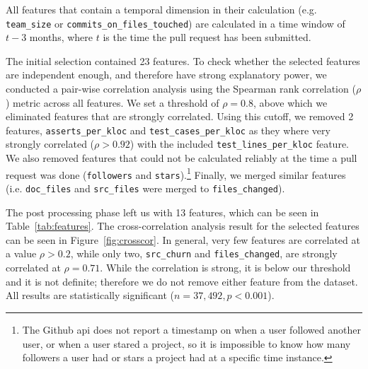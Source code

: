 \documentclass{acm_proc_article-sp}
\begin{document}
All features that contain a temporal dimension in their
calculation (e.g. \texttt{team\_size} or \texttt{commits\_on\_files\_touched})
are calculated in a time window of $t - 3$ months, where $t$ is the time the
pull request has been submitted. 

The initial selection contained 23 features. To check whe\-ther the selected
features are independent enough, and therefore have strong explanatory power, we
conducted a pair-wise correlation analysis using the Spearman rank correlation
($\rho$) metric across all features. We set a threshold of $\rho = 0.8$, above
which we eliminated features that are strongly correlated. Using this cutoff, we
removed 2 features, \texttt{asserts\_per\_kloc} and
\texttt{test\_cases\_per\_kloc} as they where very strongly correlated ($\rho >
0.92$) with the included \texttt{test\_lines\_per\_kloc} feature. We also
removed features that could not be calculated reliably at the time a pull
request was done (\texttt{followers} and \texttt{stars}).\footnote{The Github
{\sc api} does not report a timestamp on when a user followed another user, or
when a user stared a project, so it is impossible to know how many followers a
user had or stars a project had at a specific time instance.} Finally, we
merged similar features (i.e. \texttt{doc\_files} and \texttt{src\_files} were merged to \texttt{files\_changed}). 

The post processing phase left us with
13 features, which can be seen in Table~\ref{tab:features}.
The cross-correlation analysis result for the selected features can be seen in
Figure~\ref{fig:crosscor}. In general, very few features are correlated at a
value $\rho > 0.2$, while only two, \texttt{src\_churn} and
\texttt{files\_changed}, are strongly correlated at $\rho = 0.71$. While the
correlation is strong, it is below our threshold and it is not definite;
therefore we do not remove either feature from the dataset. All results are
statistically significant ($n = 37,492, p < 0.001$).
\end{document}

